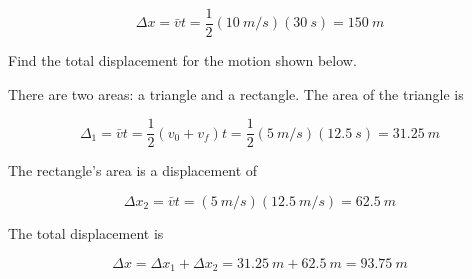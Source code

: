 \documentclass[]{exam}
\begin{document}
\begin{questions}
\begin{solution}
\begin{equation*}
    \Delta x = \bar{v} t = \frac{1}{2}(\SI{10}{m/s})(\SI{30}{s}) = \boxed{\SI{150}{m}}
\end{equation*}
\end{solution}

\question
Find the total displacement for the motion shown below.

\begin{center}
\end{center}

\begin{solution}
There are two areas: a triangle and a rectangle. The area of the triangle is

\begin{equation*}
    \Delta_1 = \bar{v} t = \frac{1}{2}(v_0 + v_f) t = \frac{1}{2}(\SI{5}{m/s}) (\SI{12.5}{s}) = \SI{31.25}{m}
\end{equation*}

The rectangle's area is a displacement of

\begin{equation*}
    \Delta x_2 = \bar{v}t = (\SI{5}{m/s})(\SI{12.5}{m/s}) = \SI{62.5}{m}
\end{equation*}

The total displacement is

\begin{equation*}
    \Delta x = \Delta x_1 + \Delta x_2 = \SI{31.25}{m} + \SI{62.5}{m} = \boxed{\SI{93.75}{m}}
\end{equation*}
\end{solution}


\end{questions}
\end{document}
